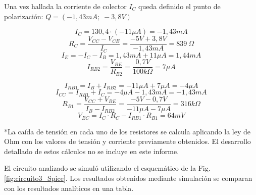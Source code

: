\documentclass[10pt]{article}
\begin{document}
Una vez hallada la corriente de colector $I_C$ queda definido el punto de polarización:  $Q = (-1,43 mA ;\; -3,8 V)$
\setlength{\columnsep}{0.2cm} 
\begin{multicols}{2}

    \begin{equation*}
    I_C = 130,4 \cdot (-11\mu A) = -1,43mA
    \end{equation*}
    \vspace{0.1cm}
    \begin{equation*}
    R_C = \frac{V_{CC} - V_{CE}}{I_C} = \frac{-5V + 3,8V}{-1,43mA } = 839\: \Omega
    \end{equation*}
    \vspace{0.1cm}
    \begin{equation*}
    I_E = -I_C - I_B = 1,43mA + 11\mu A = 1,44mA
    \end{equation*}
    \vspace{0.1cm}
    \begin{equation*}
    I_{RB2} = \frac{V_{BE}}{R_{B2}} = \frac{0,7V}{100k \Omega} = 7 \mu A
    \end{equation*}

    
    \columnbreak
    \begin{equation*}
    I_{RB1} = I_{B} + I_{RB2} = -11 \mu A + 7 \mu A = -4 \mu A
    \end{equation*}
    \vspace{0.1cm}
    \begin{equation*}
    I_{CC} = I_{RB1} + I_C = -4 \mu A -1,43mA = -1,43 mA
    \end{equation*}
    \vspace{0.1cm}
    \begin{equation*}
    R_{B1} = \frac{V_{CC} + V_{BE}}{I_B -I_{RB2}} = \frac{-5V - 0,7V}{-11\mu A -7 \mu A} = 316k\Omega
    \end{equation*}
    \vspace{0.1cm}
    \begin{equation*}
    V_{BC} = I_C\cdot R_C -I_{RB1}\cdot R_{B1} = 64mV
    \end{equation*}
  
\end{multicols}
*La caída de tensión en cada uno de los resistores se calcula aplicando la ley de Ohm con los valores de tensión y corriente previamente obtenidos. El desarrollo detallado de estos cálculos no se incluye en este informe. 

El circuito analizado se simuló utilizando el esquemático de la Fig. \ref{fig:circuito3_Spice}. Los resultados obtenidos mediante simulación se comparan con los resultados analíticos en una tabla.
\end{document}
